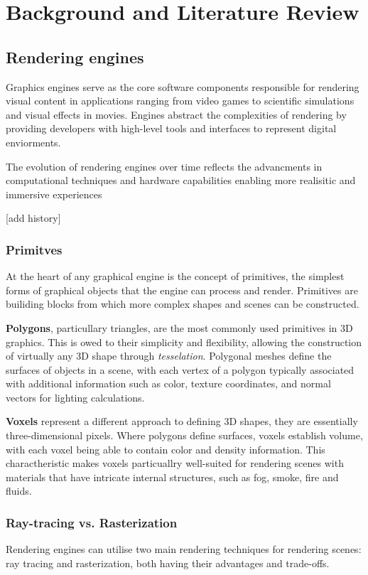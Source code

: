 
\section{Background and Literature Review}
\subsection{Rendering engines}
Graphics engines serve as the core software components responsible for rendering visual content in applications ranging from video games to scientific simulations and visual effects in movies.
Engines abstract the complexities of rendering by providing developers with high-level tools and interfaces to represent digital enviorments.

The evolution of rendering engines over time reflects the advancments in computational techniques and hardware capabilities enabling more realisitic and immersive experiences

[add history]
\subsubsection{Primitves}
At the heart of any graphical engine is the concept of primitives, the simplest forms of graphical objects that the engine can process and render. Primitives are builiding blocks from which more complex shapes and scenes can be constructed.

\textbf{Polygons}, particullary triangles, are the most commonly used primitives in 3D graphics. This is owed to their simplicity and flexibility, allowing the construction of virtually any 3D shape through \emph{tesselation}. Polygonal meshes define the surfaces of objects in a scene, with each vertex of a polygon typically associated with additional information such as color, texture coordinates, and normal vectors for lighting calculations.

\textbf{Voxels} represent a different approach to defining 3D shapes, they are essentially three-dimensional pixels. Where polygons define surfaces, voxels establish volume, with each voxel being able to contain color and density information.
This charactheristic makes voxels particuallry well-suited for rendering scenes with materials that have intricate internal structures, such as fog, smoke, fire and fluids.

\subsubsection{Ray-tracing vs. Rasterization}
Rendering engines can utilise two main rendering techniques for rendering scenes: ray tracing and rasterization, both having their advantages and trade-offs.

